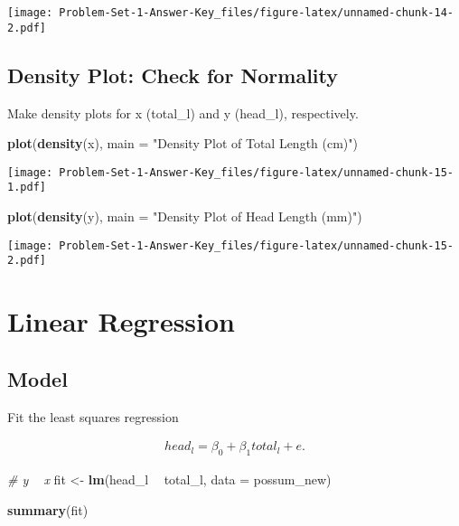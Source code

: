 \documentclass[
]{book}
\newenvironment{Shaded}{\begin{snugshade}}{\end{snugshade}}
\newcommand{\CommentTok}[1]{\textcolor[rgb]{0.56,0.35,0.01}{\textit{#1}}}
\newcommand{\DataTypeTok}[1]{\textcolor[rgb]{0.13,0.29,0.53}{#1}}
\newcommand{\KeywordTok}[1]{\textcolor[rgb]{0.13,0.29,0.53}{\textbf{#1}}}
\newcommand{\NormalTok}[1]{#1}
\newcommand{\OperatorTok}[1]{\textcolor[rgb]{0.81,0.36,0.00}{\textbf{#1}}}
\newcommand{\StringTok}[1]{\textcolor[rgb]{0.31,0.60,0.02}{#1}}
\begin{document}
\texttt{[image: Problem-Set-1-Answer-Key\_files/figure-latex/unnamed-chunk-14-2.pdf]}

\hypertarget{density-plot-check-for-normality}{%
\subsection{Density Plot: Check for Normality}\label{density-plot-check-for-normality}}

Make density plots for x (total\_l) and y (head\_l), respectively.

\begin{Shaded}
\begin{Highlighting}[]
\KeywordTok{plot}\NormalTok{(}\KeywordTok{density}\NormalTok{(x), }\DataTypeTok{main =} \StringTok{"Density Plot of Total Length (cm)"}\NormalTok{)}
\end{Highlighting}
\end{Shaded}

\texttt{[image: Problem-Set-1-Answer-Key\_files/figure-latex/unnamed-chunk-15-1.pdf]}

\begin{Shaded}
\begin{Highlighting}[]
\KeywordTok{plot}\NormalTok{(}\KeywordTok{density}\NormalTok{(y), }\DataTypeTok{main =} \StringTok{"Density Plot of Head Length (mm)"}\NormalTok{)}
\end{Highlighting}
\end{Shaded}

\texttt{[image: Problem-Set-1-Answer-Key\_files/figure-latex/unnamed-chunk-15-2.pdf]}

\hypertarget{linear-regression}{%
\section{Linear Regression}\label{linear-regression}}

\hypertarget{model}{%
\subsection{Model}\label{model}}

Fit the least squares regression

\begin{align}
head_l = \beta_0 + \beta_1 total_l + e.
\end{align}

\begin{Shaded}
\begin{Highlighting}[]
\CommentTok{# y ~ x}
\NormalTok{fit <-}\StringTok{ }\KeywordTok{lm}\NormalTok{(head_l }\OperatorTok{~}\StringTok{ }\NormalTok{total_l, }\DataTypeTok{data =}\NormalTok{ possum_new)}

\KeywordTok{summary}\NormalTok{(fit)}
\end{Highlighting}
\end{Shaded}
\end{document}
